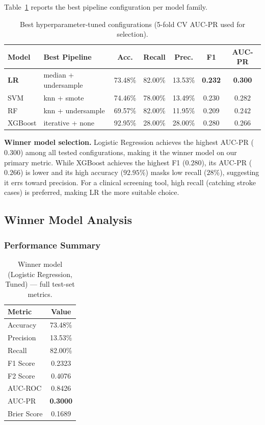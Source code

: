 \documentclass[11pt,a4paper]{article}
\begin{document}
Table~\ref{tab:hyper} reports the best pipeline configuration per model family.

\begin{table}[H]
  \centering
  \caption{Best hyperparameter-tuned configurations (5-fold CV AUC-PR used for selection).}
  \label{tab:hyper}
  \renewcommand{\arraystretch}{1.1}
  \begin{tabular}{llccccc}
    \toprule
    \textbf{Model} & \textbf{Best Pipeline} & \textbf{Acc.} & \textbf{Recall} & \textbf{Prec.} & \textbf{F1} & \textbf{AUC-PR} \\
    \midrule
    \textbf{LR}  & median + undersample & 73.48\% & 82.00\% & 13.53\% & \textbf{0.232} & \textbf{0.300} \\
    SVM          & knn + smote          & 74.46\% & 78.00\% & 13.49\% & 0.230 & 0.282 \\
    RF           & knn + undersample    & 69.57\% & 82.00\% & 11.95\% & 0.209 & 0.242 \\
    XGBoost      & iterative + none     & 92.95\% & 28.00\% & 28.00\% & 0.280 & 0.266 \\
    \bottomrule
  \end{tabular}
\end{table}

\textbf{Winner model selection.}
Logistic Regression achieves the highest AUC-PR ($0.300$) among all tested configurations, making it the winner model on our primary metric.
While XGBoost achieves the highest F1 ($0.280$), its AUC-PR ($0.266$) is lower and its high accuracy ($92.95\%$) masks low recall ($28\%$), suggesting it errs toward precision.
For a clinical screening tool, high recall (catching stroke cases) is preferred, making LR the more suitable choice.

\subsection{Winner Model Analysis}

\subsubsection{Performance Summary}

\begin{table}[H]
  \centering
  \caption{Winner model (Logistic Regression, Tuned) — full test-set metrics.}
  \label{tab:winner}
  \begin{tabular}{lc}
    \toprule
    \textbf{Metric} & \textbf{Value} \\
    \midrule
    Accuracy        & 73.48\% \\
    Precision       & 13.53\% \\
    Recall          & 82.00\% \\
    F1 Score        & 0.2323 \\
    F2 Score        & 0.4076 \\
    AUC-ROC         & 0.8426 \\
    AUC-PR          & \textbf{0.3000} \\
    Brier Score     & 0.1689 \\
    \bottomrule
  \end{tabular}
\end{table}
\end{document}
